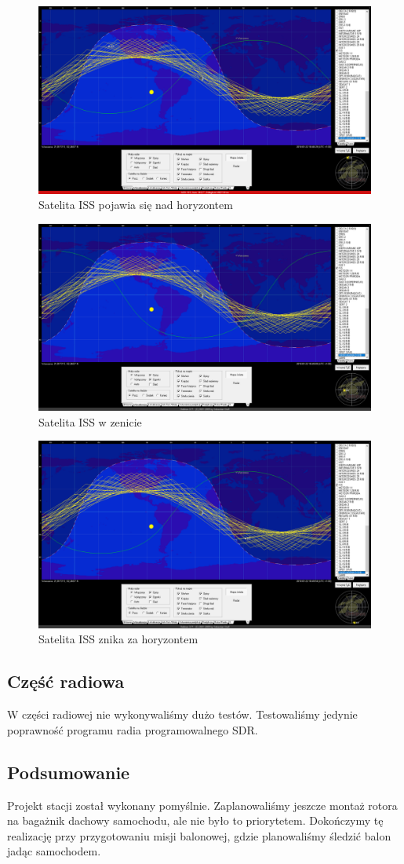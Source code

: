 \begin{figure}[h]
	\centering
		\includegraphics[width=0.7 \textwidth]{testy/pojawia}
	\caption{Satelita ISS pojawia się nad horyzontem}	
	\label{fig:pojawia}
\end{figure}


\begin{figure}[h]
	\centering
		\includegraphics[width=0.7 \textwidth]{testy/zenit}
	\caption{Satelita ISS w zenicie}	
	\label{fig:zenit}
\end{figure}


\begin{figure}[h]
	\centering
		\includegraphics[width=0.7 \textwidth]{testy/znika}
	\caption{Satelita ISS znika za horyzontem}	
	\label{fig:zanika}
\end{figure}




\subsection{Część radiowa}

W części radiowej nie wykonywaliśmy dużo testów. Testowaliśmy jedynie poprawność programu radia programowalnego SDR.

\subsection{Podsumowanie}

Projekt stacji został wykonany pomyślnie. Zaplanowaliśmy jeszcze montaż rotora na bagażnik dachowy samochodu, ale nie było to priorytetem. Dokończymy tę realizację przy przygotowaniu misji balonowej, gdzie planowaliśmy śledzić balon jadąc samochodem.
